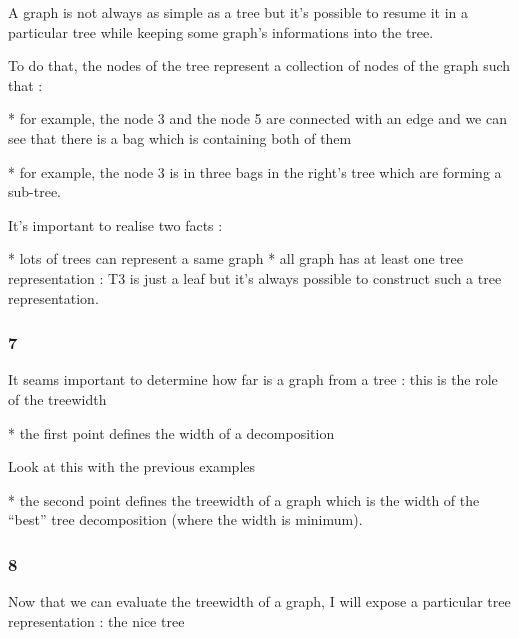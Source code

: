 \documentclass[a4paper, 10pt,french,landscape]{article}
\begin{document}
\begin{multicols}{3}
A graph is not always as simple as a tree but it's possible to resume it  in a particular tree while keeping some graph's informations into the tree. 

To do that, the nodes of the tree represent a collection of nodes of the graph such that : 

* for example, the node 3 and the node 5 are connected with an edge and we can see that there is a bag which is containing both of them

* for example, the node 3 is in three bags in the right's tree which are forming a sub-tree.

It's important to realise two facts : 

* lots of  trees can represent a same graph
* all graph has at least one tree representation : T3 is just a leaf but it's always possible to construct such a tree representation.


\subsubsection*{ 7}


It seams important to determine how far is a graph from a tree : this is the role of the treewidth

* the first point defines the width of a decomposition

Look at this with the previous examples

* the second point defines the treewidth of a graph which is the width of the ``best'' tree decomposition (where the width is minimum).









\subsubsection*{ 8}

Now that we can evaluate the treewidth of a graph, I will expose a particular tree representation : the nice  tree


\end{multicols}
\end{document}
